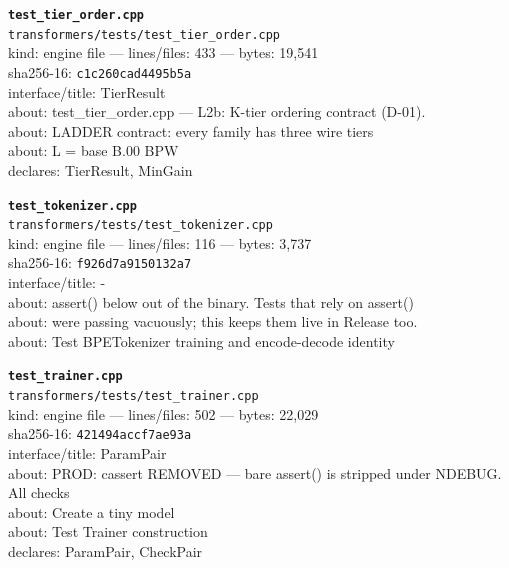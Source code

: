 \noindent\textbf{\texttt{test\_tier\_order.cpp}}\\
\texttt{transformers/tests/test\_tier\_order.cpp}\\
kind: engine file --- lines/files: 433 --- bytes: 19,541\\
sha256-16: \texttt{c1c260cad4495b5a}\\
interface/title: TierResult\\
about: test\_tier\_order.cpp — L2b: K-tier ordering contract (D-01).\\
about: LADDER contract: every family has three wire tiers\\
about: L = base          B.00 BPW\\
declares: TierResult, MinGain\\
\vspace*{6.0pt}
\newpage

\noindent\textbf{\texttt{test\_tokenizer.cpp}}\\
\texttt{transformers/tests/test\_tokenizer.cpp}\\
kind: engine file --- lines/files: 116 --- bytes: 3,737\\
sha256-16: \texttt{f926d7a9150132a7}\\
interface/title: -\\
about: assert() below out of the binary. Tests that rely on assert()\\
about: were passing vacuously; this keeps them live in Release too.\\
about: Test BPETokenizer training and encode-decode identity\\
\vspace*{6.0pt}

\noindent\textbf{\texttt{test\_trainer.cpp}}\\
\texttt{transformers/tests/test\_trainer.cpp}\\
kind: engine file --- lines/files: 502 --- bytes: 22,029\\
sha256-16: \texttt{421494accf7ae93a}\\
interface/title: ParamPair\\
about: PROD: cassert REMOVED — bare assert() is stripped under NDEBUG. All checks\\
about: Create a tiny model\\
about: Test Trainer construction\\
declares: ParamPair, CheckPair\\
\vspace*{6.0pt}

